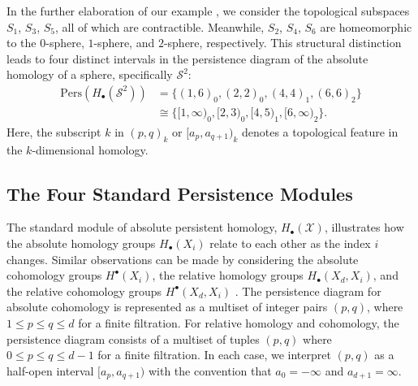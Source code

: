 \begin{example}
    In the further elaboration of our example \cite[\S 2.3, Example]{de2011dualities}, we consider the topological subspaces $S_{1}$,
    $S_{3}$, $S_{5}$, all of which are contractible. Meanwhile,
    $S_{2}$, $S_{4}$, $S_{6}$ are homeomorphic to the $0$-sphere, $1$-sphere, and $2$-sphere,
    respectively. This structural distinction leads to four distinct intervals in
    the persistence diagram of the absolute homology of a sphere, specifically $\mathcal{S}^{2}$:
    \begin{align}
        \mathrm{Pers}(H_{\bullet}(\mathcal{S}^{2})) & = \{(1,6)_{0}, (2,2)_{0}, (4,4)_{1}, (6,6)_{2} \}             \\
                                                    & \cong \{[1,\infty)_{0}, [2,3)_{0}, [4,5)_{1}, [6, \infty)_{2} \}.
    \end{align}
    Here, the subscript $k$ in $(p,q)_{k}$ or $[a_{p}, a_{q+1})_{k}$ denotes a topological
    feature in the $k$-dimensional homology.
\end{example}

\subsection{The Four Standard Persistence Modules}
\label{TheFourStandardPersistenceModules}
The standard module of absolute persistent homology, $H_{\bullet}(\mathcal{X})$, illustrates how the absolute homology groups
$H_{\bullet}(X_{i})$ relate to each other as the index $i$ changes. Similar observations
can be made by considering the absolute cohomology groups $H^{\bullet}(X_{i})$,
the relative homology groups $H_{\bullet}(X_{d}, X_{i})$, and the relative cohomology
groups $H^{\bullet}(X_{d}, X_{i})$ \cite[\S 2.4]{de2011dualities}. The persistence diagram for absolute cohomology is represented as a multiset of integer
pairs $(p,q)$, where $1 \leq p \leq q \leq d$ for a finite filtration. For relative
homology and cohomology, the persistence diagram consists of a multiset of
tuples $(p,q)$ where $0 \leq p \leq q \leq d-1$ for a finite filtration. In each
case, we interpret $(p,q)$ as a half-open interval $[a_{p}, a_{q+1})$ with the
convention that $a_{0} = -\infty$ and $a_{d+1} = \infty$.

